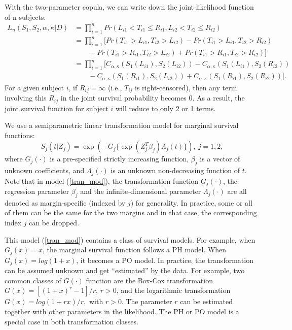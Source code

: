 With the two-parameter copula, we can write down the joint likelihood function of n subjects:
\begin{align}
\label{joint_likelihood}
L_{n}(S_1, S_2, \alpha,\kappa|D) & = \prod_{i=1}^n Pr(L_{i1} < T_{i1} \leq R_{i1}, L_{i2} < T_{i2} \leq R_{i2}) \nonumber \\ & = \prod_{i=1}^n \biggl[Pr(T_{i1} > L_{i1}, T_{i2} > L_{i2}) - Pr(T_{i1} > L_{i1}, T_{i2} > R_{i2}) \nonumber \\ & \qquad - Pr(T_{i1} > R_{i1}, T_{i2} > L_{i2}) + Pr(T_{i1} > R_{i1}, T_{i2} > R_{i2}) \biggl]  \nonumber \\ & = \prod_{i=1}^n\biggl[C_{\alpha,\kappa}(S_1(L_{i1}),S_2(L_{i2})) - C_{\alpha,\kappa}(S_1(L_{i1}),S_2(R_{i2})) \nonumber \\ & \qquad - C_{\alpha,\kappa}(S_1(R_{i1}),S_2(L_{i2})) + C_{\alpha,\kappa}(S_1(R_{i1}),S_2(R_{i2})) \biggr].
\end{align}
For a given subject $i$, if $R_{ij} = \infty$ (i.e., $T_{ij}$ is right-censored), then any term involving this $R_{ij}$ in the joint survival probability becomes 0. As a result, the joint survival function for subject $i$ will reduce to only 2 or 1 terms.

We use a semiparametric linear transformation model for marginal survival functions:
\begin{equation}
S_{j}(t|Z_j) = \exp(-G_j\{\exp(Z_j^{T}\beta_j)\Lambda_{j}(t)\}), \ j = 1,2, \label{tran_mod}
\end{equation}
where $G_j(\cdot)$ is a pre-specified strictly increasing function, $\beta_j$ is a vector of unknown coefficients, and $\Lambda_{j}(\cdot)$ is an unknown non-decreasing function of $t$. Note that in model (\ref{tran_mod}), the transformation function $G_j(\cdot)$, the regression parameter $\beta_j$ and the infinite-dimensional parameter $\Lambda_j(\cdot)$ are all denoted as margin-specific (indexed by $j$) for generality. In practice, some or all of them can be the same for the two margins and in that case, the corresponding index $j$ can be dropped.

This model (\ref{tran_mod}) contains a class of survival models. For example, when $G_j(x) = x$, the marginal survival function follows a PH model. When $G_j(x) = log(1+x)$, it becomes a PO model. In practice, the transformation can be assumed unknown and get ``estimated'' by the data. For example, two common classes of $G(\cdot)$ function are the Box-Cox transformation $G(x) = [(1+x)^r -1]/r$, $r > 0$, and the logarithmic transformation $G(x) = log(1+rx)/r,$ with $r > 0$. The parameter $r$ can be estimated together with other parameters in the likelihood. The PH or PO model is a special case in both transformation classes.



